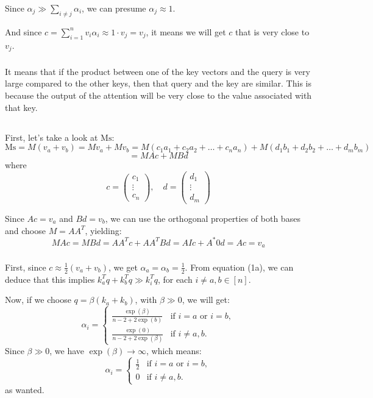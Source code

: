 \documentclass{article}
\begin{document}
\subsubsection{}
Since \(\alpha_j \gg \sum_{i \neq j} \alpha_i\), we can presume \(\alpha_j \approx 1\). 

And since \(c = \sum_{i=1}^n v_i \alpha_i \approx 1 \cdot v_j = v_j\), it means we will get \(c\) that is very close to \(v_j\).
\subsubsection{}
It means that if the product between one of the key vectors and the query is very large compared to the other keys, then that query and the key are similar. This is because the output of the attention will be very close to the value associated with that key.
\subsection{}
\subsubsection{}
First, let's take a look at \( \text{Ms} \):
\[
\text{Ms} = M(v_a + v_b) = Mv_a + Mv_b = M(c_1a_1 + c_2a_2 + \dots + c_n a_n) + M(d_1b_1 + d_2b_2 + \dots + d_m b_m)
\]
\[
= MAc + MBd
\]
where 
\[
c = \begin{pmatrix} c_1 \\ \vdots \\ c_n \end{pmatrix}, \quad d = \begin{pmatrix} d_1 \\ \vdots \\ d_m \end{pmatrix}
\]

Since \( Ac = v_a \) and \( Bd = v_b \), we can use the orthogonal properties of both bases and choose \( M = AA^T \), yielding:
\[
MAc = MBd = A A^T c + A A^T B d = A I c + A^* 0 d = A c = v_a
\]

\subsubsection{}
First, since \( c \approx \frac{1}{2} (v_a + v_b) \), we get \( \alpha_a = \alpha_b = \frac{1}{2} \). From equation (1a), we can deduce that this implies \( k_a^T q + k_b^T q \gg k_i^T q \), for each \( i \neq a, b \in [n] \).

Now, if we choose \( q = \beta (k_a + k_b) \), with \( \beta \gg 0 \), we will get:
\[
\alpha_i = \left\{
\begin{array}{ll}
\frac{\exp(\beta)}{n - 2 + 2 \exp(b)} & \text{if } i = a \text{ or } i = b, \\
\frac{\exp(0)}{n - 2 + 2 \exp(\beta)} & \text{if } i \neq a, b.
\end{array}
\right.
\]
Since \( \beta \gg 0 \), we have \( \exp(\beta) \to \infty \), which means:
\[
\alpha_i = \left\{
\begin{array}{ll}
\frac{1}{2} & \text{if } i = a \text{ or } i = b, \\
0 & \text{if } i \neq a, b.
\end{array}
\right.
\]
as wanted.
\end{document}
